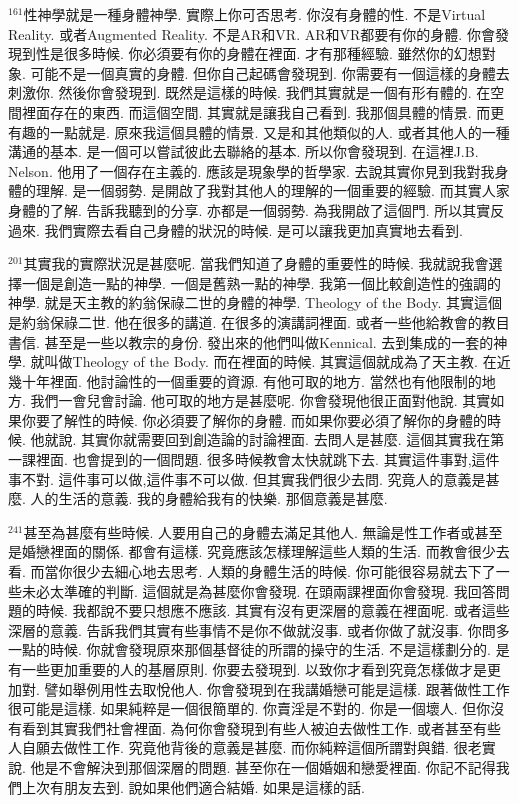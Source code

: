\documentclass{book}
\begin{document}
$^{161}$性神學就是一種身體神學.
實際上你可否思考.
你沒有身體的性.
不是Virtual Reality.
或者Augmented Reality.
不是AR和VR.
AR和VR都要有你的身體.
你會發現到性是很多時候.
你必須要有你的身體在裡面.
才有那種經驗.
雖然你的幻想對象.
可能不是一個真實的身體.
但你自己起碼會發現到.
你需要有一個這樣的身體去刺激你.
然後你會發現到.
既然是這樣的時候.
我們其實就是一個有形有體的.
在空間裡面存在的東西.
而這個空間.
其實就是讓我自己看到.
我那個具體的情景.
而更有趣的一點就是.
原來我這個具體的情景.
又是和其他類似的人.
或者其他人的一種溝通的基本.
是一個可以嘗試彼此去聯絡的基本.
所以你會發現到.
在這裡J.B. Nelson.
他用了一個存在主義的.
應該是現象學的哲學家.
去說其實你見到我對我身體的理解.
是一個弱勢.
是開啟了我對其他人的理解的一個重要的經驗.
而其實人家身體的了解.
告訴我聽到的分享.
亦都是一個弱勢.
為我開啟了這個門.
所以其實反過來.
我們實際去看自己身體的狀況的時候.
是可以讓我更加真實地去看到.

$^{201}$其實我的實際狀況是甚麼呢.
當我們知道了身體的重要性的時候.
我就說我會選擇一個是創造一點的神學.
一個是舊熟一點的神學.
我第一個比較創造性的強調的神學.
就是天主教的約翁保祿二世的身體的神學.
Theology of the Body.
其實這個是約翁保祿二世.
他在很多的講道.
在很多的演講詞裡面.
或者一些他給教會的教目書信.
甚至是一些以教宗的身份.
發出來的他們叫做Kennical.
去到集成的一套的神學.
就叫做Theology of the Body.
而在裡面的時候.
其實這個就成為了天主教.
在近幾十年裡面.
他討論性的一個重要的資源.
有他可取的地方.
當然也有他限制的地方.
我們一會兒會討論.
他可取的地方是甚麼呢.
你會發現他很正面對他說.
其實如果你要了解性的時候.
你必須要了解你的身體.
而如果你要必須了解你的身體的時候.
他就說.
其實你就需要回到創造論的討論裡面.
去問人是甚麼.
這個其實我在第一課裡面.
也會提到的一個問題.
很多時候教會太快就跳下去.
其實這件事對,這件事不對.
這件事可以做,這件事不可以做.
但其實我們很少去問.
究竟人的意義是甚麼.
人的生活的意義.
我的身體給我有的快樂.
那個意義是甚麼.

$^{241}$甚至為甚麼有些時候.
人要用自己的身體去滿足其他人.
無論是性工作者或甚至是婚戀裡面的關係.
都會有這樣.
究竟應該怎樣理解這些人類的生活.
而教會很少去看.
而當你很少去細心地去思考.
人類的身體生活的時候.
你可能很容易就去下了一些未必太準確的判斷.
這個就是為甚麼你會發現.
在頭兩課裡面你會發現.
我回答問題的時候.
我都說不要只想應不應該.
其實有沒有更深層的意義在裡面呢.
或者這些深層的意義.
告訴我們其實有些事情不是你不做就沒事.
或者你做了就沒事.
你問多一點的時候.
你就會發現原來那個基督徒的所謂的操守的生活.
不是這樣劃分的.
是有一些更加重要的人的基層原則.
你要去發現到.
以致你才看到究竟怎樣做才是更加對.
譬如舉例用性去取悅他人.
你會發現到在我講婚戀可能是這樣.
跟著做性工作很可能是這樣.
如果純粹是一個很簡單的.
你賣淫是不對的.
你是一個壞人.
但你沒有看到其實我們社會裡面.
為何你會發現到有些人被迫去做性工作.
或者甚至有些人自願去做性工作.
究竟他背後的意義是甚麼.
而你純粹這個所謂對與錯.
很老實說.
他是不會解決到那個深層的問題.
甚至你在一個婚姻和戀愛裡面.
你記不記得我們上次有朋友去到.
說如果他們適合結婚.
如果是這樣的話.
\end{document}
